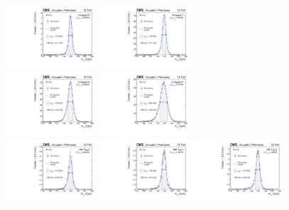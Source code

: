 \begin{figure}[ht!]
\centering
\includegraphics[width=0.3\textwidth]{modellingFigures/DCBpG/UntaggedTag_0.pdf} 
\includegraphics[width=0.3\textwidth]{modellingFigures/DCBpG/UntaggedTag_1.pdf} \\
\includegraphics[width=0.3\textwidth]{modellingFigures/DCBpG/UntaggedTag_2.pdf} 
\includegraphics[width=0.3\textwidth]{modellingFigures/DCBpG/UntaggedTag_3.pdf} \\ 
\includegraphics[width=0.3\textwidth]{modellingFigures/DCBpG/VBFTag_0.pdf}  
\includegraphics[width=0.3\textwidth]{modellingFigures/DCBpG/VBFTag_1.pdf} 
\includegraphics[width=0.3\textwidth]{modellingFigures/DCBpG/VBFTag_2.pdf} 


\end{figure}
